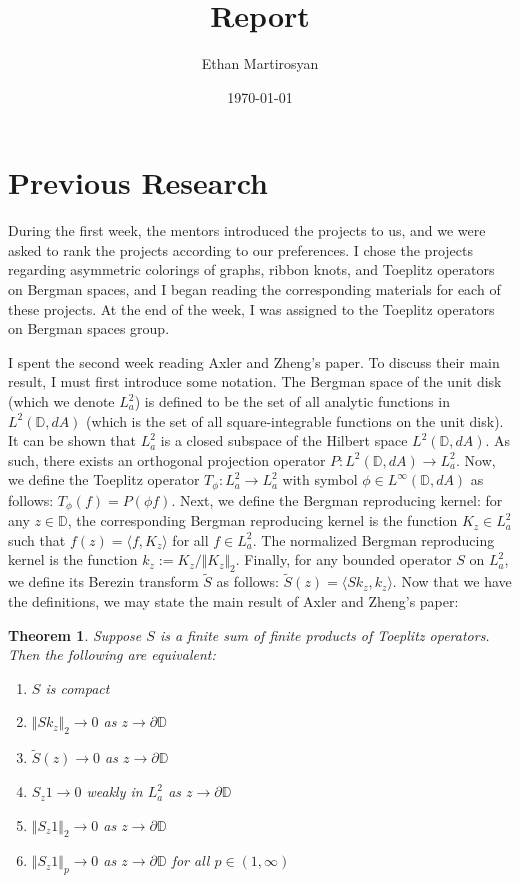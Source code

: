 \documentclass[12pt]{article}
\newtheorem{theorem}{Theorem}
\begin{document}
 
\title{Report}
\author{Ethan Martirosyan}
\date{\today}
\maketitle
{}
\hfuzz=50pt
\section*{Previous Research}
During the first week, the mentors introduced the projects to us, and we were asked to rank the projects according to our preferences. I chose the projects regarding asymmetric colorings of graphs, ribbon knots, and Toeplitz operators on Bergman spaces, and I began reading the corresponding materials for each of these projects. At the end of the week, I was assigned to the Toeplitz operators on Bergman spaces group.
\par I spent the second week reading Axler and Zheng's paper. To discuss their main result, I must first introduce some notation. The Bergman space of the unit disk (which we denote $L_a^2$) is defined to be the set of all analytic functions in $L^2(\mathbb{D},dA)$ (which is the set of all square-integrable functions on the unit disk). It can be shown that $L_a^2$ is a closed subspace of the Hilbert space $L^2(\mathbb{D},dA)$. As such, there exists an orthogonal projection operator $P: L^2(\mathbb{D},dA) \rightarrow L_a^2$. Now, we define the Toeplitz operator $T_\phi: L_a^2 \rightarrow L_a^2$ with symbol $\phi \in L^\infty(\mathbb{D},dA)$ as follows: $T_\phi(f) = P(\phi f)$. Next, we define the Bergman reproducing kernel: for any $z \in \mathbb{D}$, the corresponding Bergman reproducing kernel is the function $K_z \in L_a^2$ such that $f(z) = \langle f, K_z \rangle$ for all $f \in L_a^2$. The normalized Bergman reproducing kernel is the function $k_z := K_z/\Vert K_z \Vert_2$. Finally, for any bounded operator $S$ on $L_a^2$, we define its Berezin transform $\tilde{S}$ as follows: $\tilde{S}(z) = \langle Sk_z, k_z \rangle$. Now that we have the definitions, we may state the main result of Axler and Zheng's paper:
\begin{theorem}
Suppose $S$ is a finite sum of finite products of Toeplitz operators. Then the following are equivalent:
\begin{enumerate}
\item $S$ is compact
\item $\Vert Sk_z \Vert_2 \rightarrow 0$ as $z \rightarrow \partial{\mathbb{D}}$
\item $\tilde{S}(z) \rightarrow 0$ as $z \rightarrow \partial{\mathbb{D}}$
\item $S_z 1 \rightarrow 0$ weakly in $L_a^2$ as $z \rightarrow \partial{\mathbb{D}}$
\item $\Vert S_z 1 \Vert_2 \rightarrow 0$ as $z \rightarrow \partial{\mathbb{D}}$
\item $\Vert S_z 1\Vert_p \rightarrow 0$ as $z \rightarrow \partial{\mathbb{D}}$ for all $p \in (1,\infty)$
\end{enumerate}
\end{theorem}
\end{document}
